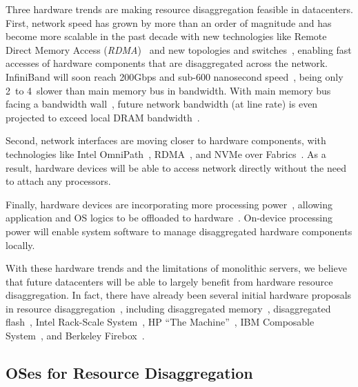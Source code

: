 Three hardware trends are making resource disaggregation feasible in datacenters.
First, network speed has grown by more than an order of magnitude and has become more scalable in the past decade %
with new technologies like Remote Direct Memory Access ({\it RDMA})~\cite{ibverbs} 
and new topologies and switches~\cite{FireBox-FASTKeynote,costa15-r2c2,Costa-WRSC14},
enabling fast accesses of hardware components that are disaggregated across the network.
InfiniBand will soon reach 200Gbps and sub-600 nanosecond speed~\cite{Mellanox-ConnectX6-IB},
being only 2\x\ to 4\x\ slower than main memory bus in bandwidth.
With main memory bus facing a bandwidth wall~\cite{BW-Wall-ISCA09},
future network bandwidth (at line rate) is even projected to exceed local DRAM bandwidth~\cite{CacheCloud-hotcloud18}.

Second, network interfaces are moving closer to hardware components,
with technologies like Intel OmniPath~\cite{OmniPath},
RDMA~\cite{ibverbs},
and NVMe over Fabrics~\cite{NVMe-fabrics-Inteltalk,NVMe-fabrics}.
As a result, hardware devices will be able to access network directly 
without the need to attach any processors. 

Finally, hardware devices are incorporating more processing power~\cite{Ahn15-PIM,Bojnordi12,Mellanox-SmartNIC,Mellanox-SmartNIC2,Agilio-SmartNIC,Junwhan-ISCA17},
allowing application and OS logics to be offloaded to hardware~\cite{Willow,Kaufmann16-ASPLOS}.
On-device processing power will enable system software to manage disaggregated hardware components locally.

With these hardware trends and the limitations of monolithic servers,
we believe that future datacenters will be able to largely benefit from hardware resource disaggregation.
In fact, there have already been several initial hardware proposals in resource disaggregation~\cite{OCP},
including disaggregated memory~\cite{Lim09-disaggregate,Scaleout-numa,Nitu18-EUROSYS}, 
disaggregated flash~\cite{FlashDisaggregation,ReFlex},
Intel Rack-Scale System~\cite{IntelRackScale}, 
HP ``The Machine''~\cite{HP-TheMachine,HP-MemoryOS}, 
IBM Composable System~\cite{IBM-Composable},
and Berkeley Firebox~\cite{FireBox-FASTKeynote}.

\subsection{OSes for Resource Disaggregation}

